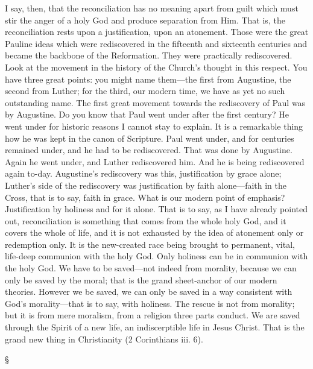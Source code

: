 \documentclass[12pt,a5paper,twoside,titlepage]{book}
\begin{document}
I say, then, that the reconciliation has no 
meaning apart from guilt which must stir the 
anger of a holy God and produce separation 
from Him. That is, the reconciliation rests 
upon a justification, upon an atonement. Those 
were the great Pauline ideas which were 
rediscovered in the fifteenth and sixteenth 
centuries and became the backbone of the Reformation.
They were practically rediscovered. 
Look at the movement in the history of the 
Church's thought in this respect. You have 
three great points: you might name them---the 
first from Augustine, the second from Luther; 
for the third, our modern time, we have as 
yet no such outstanding name. The first great 
movement towards the rediscovery of Paul 
was by Augustine. Do you know that Paul 
went under after the first century? He went 
under for historic reasons I cannot stay to 
explain. It is a remarkable thing how he was 
kept in the canon of Scripture. Paul went 
under, and for centuries remained under, and 
he had to be rediscovered. That was done by 
Augustine. Again he went under, and Luther 
rediscovered him. And he is being rediscovered 
again to-day. Augustine's rediscovery was this, 
justification by grace alone; Luther's side of the 
rediscovery was justification by faith alone---faith 
in the Cross, that is to say, faith in grace. 
What is our modern point of emphasis? Justification 
by holiness and for it alone. That is to 
say, as I have already pointed out, reconciliation 
is something that comes from the whole holy 
God, and it covers the whole of life, and it is not 
exhausted by the idea of atonement only or 
redemption only. It is the new-created race 
being brought to permanent, vital, life-deep 
communion with the holy God. Only holiness 
can be in communion with the holy God. We 
have to be saved---not indeed from morality, 
because we can only be saved by the moral; that 
is the grand sheet-anchor of our modern theories. 
However we be saved, we can only be saved 
in a way consistent with God's morality---that 
is to say, with holiness. The rescue is not from 
morality; but it is from mere moralism, from 
a religion three parts conduct. We are saved 
through the Spirit of a new life, an indiscerptible 
life in Jesus Christ. That is the grand 
new thing in Christianity (2 Corinthians iii. 6). 

\begin{center}
\S
\end{center}
\end{document}
